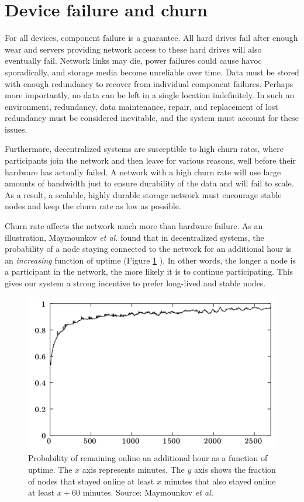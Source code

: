 \documentclass[11pt,fleqn,openany]{book}
\begin{document}
\section{Device failure and churn}

For all devices, component failure is a guarantee.
All hard drives fail after enough wear
\cite{backblaze-hd-2018-q1} and servers providing network access to
these hard drives will also eventually fail. Network links may die, power
failures could cause havoc sporadically,
and storage media become unreliable over time.
Data must be stored with enough redundancy to recover from
individual component failures.
Perhaps more importantly, no data can be left in a single location
indefinitely. In such an environment, redundancy, data
maintenance, repair, and replacement of lost redundancy must be considered
inevitable, and the system must account for these issues.

Furthermore, decentralized systems are susceptible to high churn rates, where
participants join the network and then leave for various reasons, well
before their hardware has actually failed. A network with a high churn rate will
use large amounts of bandwidth just to ensure durability of the data and
will fail to scale. As a result, a scalable, highly durable storage
network must encourage stable nodes and keep the churn rate as low as possible.

Churn rate affects the network much more than hardware failure. As an
illustration, Maymounkov {\em et al.} found that in
decentralized systems, the probability of a node staying connected to the
network for an additional hour is an {\em increasing}
function of uptime (Figure \ref{fig:kad-uptime} \cite{kad}).
In other words, the longer a node is a
participant in the network, the more likely it is to continue
participating. This gives our system a strong incentive to prefer long-lived
and stable nodes.

\begin{figure}
\centering
\includegraphics[width=.6\textwidth]{images/uptime.png}
\caption{Probability of remaining online an additional hour as a function of
uptime.
The $x$ axis represents minutes. The $y$ axis shows the fraction of nodes
that stayed online at least $x$ minutes that also stayed online at least
$x+60$ minutes. Source: Maymounkov {\em et al.} \cite{kad}}
\label{fig:kad-uptime}
\end{figure}
\end{document}
